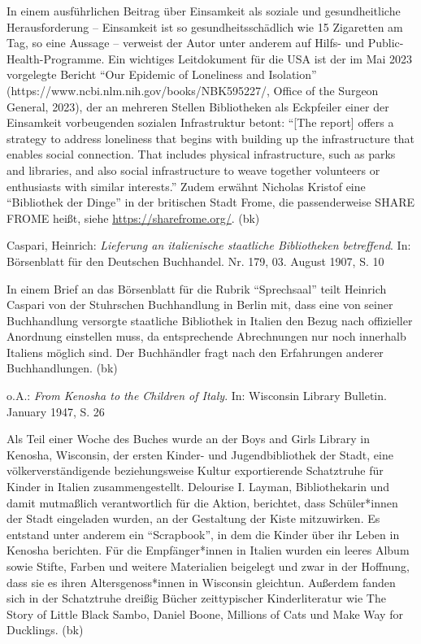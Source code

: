 \documentclass[a4paper,
fontsize=11pt,
oneside,
numbers=noperiodatend,
parskip=half-,
bibliography=totoc,
final
]{scrartcl}
\begin{document}
In einem ausführlichen Beitrag über Einsamkeit als soziale und
gesundheitliche Herausforderung -- Einsamkeit ist so
gesundheitsschädlich wie 15 Zigaretten am Tag, so eine Aussage --
verweist der Autor unter anderem auf Hilfs- und Public-Health-Programme.
Ein wichtiges Leitdokument für die USA ist der im Mai 2023 vorgelegte
Bericht \enquote{Our Epidemic of Loneliness and Isolation} (https://www.ncbi.nlm.nih.gov/books/NBK595227/, Office of
the Surgeon General, 2023), der an mehreren Stellen
Bibliotheken als Eckpfeiler einer der Einsamkeit vorbeugenden sozialen
Infrastruktur betont: \enquote{{[}The report{]} offers a strategy to
address loneliness that begins with building up the infrastructure that
enables social connection. That includes physical infrastructure, such
as parks and libraries, and also social infrastructure to weave together
volunteers or enthusiasts with similar interests.} Zudem erwähnt
Nicholas Kristof eine \enquote{Bibliothek der Dinge} in der britischen
Stadt Frome, die passenderweise SHARE FROME heißt, siehe
\href{https://sharefrome.org/}{\uline{https://sharefrome.org/}}. (bk)

Caspari, Heinrich: \emph{Lieferung an italienische staatliche
Bibliotheken betreffend}. In: Börsenblatt für den Deutschen Buchhandel.
Nr. 179, 03. August 1907, S. 10

In einem Brief an das Börsenblatt für die Rubrik \enquote{Sprechsaal}
teilt Heinrich Caspari von der Stuhrschen Buchhandlung in Berlin mit,
dass eine von seiner Buchhandlung versorgte staatliche Bibliothek in
Italien den Bezug nach offizieller Anordnung einstellen muss, da
entsprechende Abrechnungen nur noch innerhalb Italiens möglich sind. Der
Buchhändler fragt nach den Erfahrungen anderer Buchhandlungen. (bk)

o.A.: \emph{From Kenosha to the Children of Italy}. In: Wisconsin
Library Bulletin. January 1947, S. 26

Als Teil einer Woche des Buches wurde an der Boys and Girls Library in
Kenosha, Wisconsin, der ersten Kinder- und Jugendbibliothek der Stadt,
eine völkerverständigende beziehungsweise Kultur exportierende
Schatztruhe für Kinder in Italien zusammengestellt. Delourise I. Layman,
Bibliothekarin und damit mutmaßlich verantwortlich für die Aktion,
berichtet, dass Schüler*innen der Stadt eingeladen wurden, an der
Gestaltung der Kiste mitzuwirken. Es entstand unter anderem ein
\enquote{Scrapbook}, in dem die Kinder über ihr Leben in Kenosha
berichten. Für die Empfänger*innen in Italien wurden ein leeres Album
sowie Stifte, Farben und weitere Materialien beigelegt und zwar in der
Hoffnung, dass sie es ihren Altersgenoss*innen in Wisconsin gleichtun.
Außerdem fanden sich in der Schatztruhe dreißig Bücher zeittypischer
Kinderliteratur wie The Story of Little Black Sambo, Daniel Boone,
Millions of Cats und Make Way for Ducklings. (bk)
\end{document}
